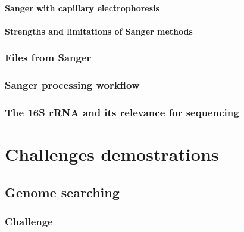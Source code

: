 \documentclass[
  letterpaper,
]{scrbook}
\begin{document}
\hypertarget{sanger-with-capillary-electrophoresis}{%
\subsection*{Sanger with capillary
electrophoresis}\label{sanger-with-capillary-electrophoresis}}

\hypertarget{strengths-and-limitations-of-sanger-methods}{%
\subsection*{Strengths and limitations of Sanger
methods}\label{strengths-and-limitations-of-sanger-methods}}

\hypertarget{files-from-sanger}{%
\section*{Files from Sanger}\label{files-from-sanger}}

\hypertarget{sanger-processing-workflow}{%
\section*{Sanger processing workflow}\label{sanger-processing-workflow}}

\hypertarget{the-16s-rrna-and-its-relevance-for-sequencing}{%
\section*{The 16S rRNA and its relevance for
sequencing}\label{the-16s-rrna-and-its-relevance-for-sequencing}}

\part{Challenges demostrations}

\hypertarget{genome-searching}{%
\chapter{Genome searching}\label{genome-searching}}

\hypertarget{challenge}{%
\section*{Challenge}\label{challenge}}
\end{document}
